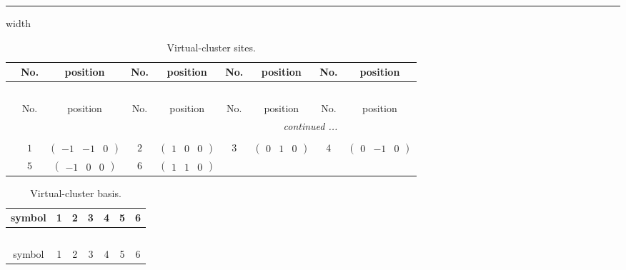 \documentclass[fleqn,10pt,landscape]{article}
\begin{document}
\begin{itemize}
 \hfil \hrule height 1mm width \textwidth \hfil

{
\scriptsize
\begin{center}
\renewcommand{\arraystretch}{1.7}
\begin{longtable}{ccccccccc}
\caption{Virtual-cluster sites.}
 \\
 \hline \hline
 & No. & position & No. & position & No. & position & No. & position \\ \hline \endfirsthead

\multicolumn{8}{l}{\tablename\ \thetable{}} \\
 \hline \hline
 & No. & position & No. & position & No. & position & No. & position \\ \hline \endhead

 \hline \hline
\multicolumn{8}{r}{\footnotesize\it continued ...} \\ \endfoot

 \hline \hline
\multicolumn{8}{r}{} \\ \endlastfoot

 & $ 1 $ & $ \begin{pmatrix} -1 & -1 & 0 \end{pmatrix} $ & $ 2 $ & $ \begin{pmatrix} 1 & 0 & 0 \end{pmatrix} $ & $ 3 $ & $ \begin{pmatrix} 0 & 1 & 0 \end{pmatrix} $ & $ 4 $ & $ \begin{pmatrix} 0 & -1 & 0 \end{pmatrix} $ \\
& $ 5 $ & $ \begin{pmatrix} -1 & 0 & 0 \end{pmatrix} $ & $ 6 $ & $ \begin{pmatrix} 1 & 1 & 0 \end{pmatrix} $ & $  $ & $  $ & $  $ & $  $ \\
\end{longtable}
\end{center}
\begin{center}
\renewcommand{\arraystretch}{1.7}
\begin{longtable}{ccccccc}
\caption{Virtual-cluster basis.}
 \\
 \hline \hline
symbol & 1 & 2 & 3 & 4 & 5 & 6 \\ \hline \endfirsthead

\multicolumn{6}{l}{\tablename\ \thetable{}} \\
 \hline \hline
symbol & 1 & 2 & 3 & 4 & 5 & 6 \\ \hline \endhead


\end{longtable}
\end{center}}
\end{itemize}
\end{document}
